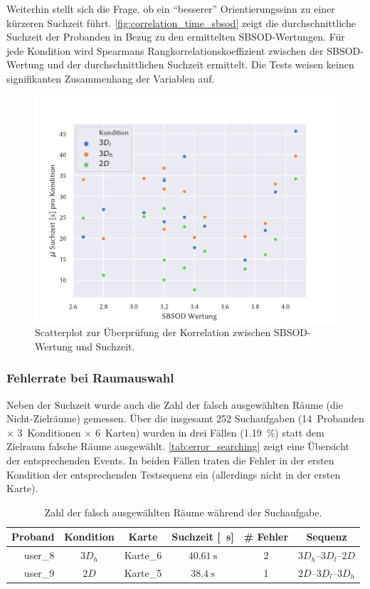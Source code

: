 Weiterhin stellt sich die Frage, ob ein \enquote{besserer} Orientierungssinn zu einer kürzeren Suchzeit führt.
\autoref{fig:correlation_time_sbsod} zeigt die durchschnittliche Suchzeit der Probanden in Bezug zu den ermittelten SBSOD-Wertungen.
Für jede Kondition wird Spearmans Rangkorrelationskoeffizient zwischen der SBSOD-Wertung und der durchschnittlichen Suchzeit ermittelt.
Die Tests weisen keinen signifikanten Zusammenhang der Variablen auf.
\begin{figure}[h]
    \centering
    \includegraphics[trim={0cm, 0cm, 1.25cm, 1.25cm}, clip, width=0.75\linewidth]{figures/analysis/correlation_time_sbsod_scatter}
    \caption{Scatterplot zur Überprüfung der Korrelation zwischen SBSOD-Wertung und Suchzeit.}
    \label{fig:correlation_time_sbsod}
\end{figure}

\subsubsection*{Fehlerrate bei Raumauswahl}
Neben der Suchzeit wurde auch die Zahl der falsch ausgewählten Räume (die Nicht-Zielräume) gemessen.
Über die insgesamt 252 Suchaufgaben (14~Probanden $\times$ 3~Konditionen $\times$ 6~Karten) wurden in drei Fällen (\SI{1,19}{\percent}) statt dem Zielraum falsche Räume ausgewählt.
\autoref{tab:error_searching} zeigt eine Übersicht der entsprechenden Events.
In beiden Fällen traten die Fehler in der ersten Kondition der entsprechenden Testsequenz ein (allerdings nicht in der ersten Karte).
\begin{table}[h]
    \centering
    \caption{Zahl der falsch ausgewählten Räume während der Suchaufgabe.}
    \label{tab:error_searching}
    \begin{tabular}{rccccc}\toprule
        Proband                  & Kondition               & Karte    & Suchzeit [\SI{}{\second}] & \# Fehler & Sequenz  \\\midrule
        user\_8                  & $3D_h$                  & Karte\_6 & $\SI{40,61}{\second}$     & 2         & $3D_h$--$3D_l$--$2D$ \\
        user\_9                  & $2D$                    & Karte\_5 & $\SI{38,4}{\second}$      & 1         & $2D$--$3D_l$--$3D_h$ \\\bottomrule
    \end{tabular}
\end{table}


